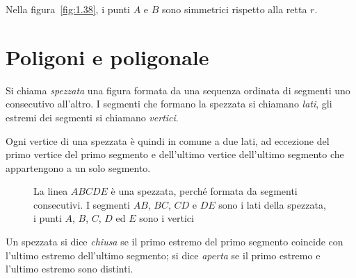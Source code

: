 Nella figura~\ref{fig:1.38}, i punti $A$ e $B$ sono simmetrici 
rispetto alla retta $r$.

\vspazio\ovalbox{\risolvii \ref{ese:1.66}, \ref{ese:1.67}, 
\ref{ese:1.68}, \ref{ese:1.69}, \ref{ese:1.70}, \ref{ese:1.71}, 
\ref{ese:1.72}, \ref{ese:1.73}, \ref{ese:1.74}, \ref{ese:1.75}, 
\ref{ese:1.76}, \ref{ese:1.77}, \ref{ese:1.78},}

\ovalbox{\ref{ese:1.79}, \ref{ese:1.80}, \ref{ese:1.81}, 
\ref{ese:1.82}, \ref{ese:1.83}, \ref{ese:1.84}, \ref{ese:1.85}, 
\ref{ese:1.86}, \ref{ese:1.87}, \ref{ese:1.88}, \ref{ese:1.89}, 
\ref{ese:1.90}, \ref{ese:1.91}, \ref{ese:1.92},\ref{ese:1.93}, 
\ref{ese:1.94}, \ref{ese:1.95},}

\ovalbox{\ref{ese:1.96}, \ref{ese:1.97}, \ref{ese:1.98}, 
\ref{ese:1.99}, \ref{ese:1.100}, \ref{ese:1.101}, \ref{ese:1.102}, 
\ref{ese:1.103}}




\section{Poligoni e poligonale}\label{sect:poligoni}

\begin{definizione}
Si chiama \emph{spezzata} una figura formata da una sequenza ordinata 
di segmenti uno consecutivo all'altro. I segmenti che formano la 
spezzata si chiamano \emph{lati}, gli estremi dei segmenti si 
chiamano \emph{vertici}.
\end{definizione}

Ogni vertice di una spezzata è quindi in comune a due lati, ad 
eccezione del primo vertice del primo segmento e dell'ultimo vertice 
dell'ultimo segmento che appartengono a un solo segmento.


\begin{inaccessibleblock}
 \begin{figure}[htb]
\centering
\caption{La linea $ABCDE$ è una spezzata, perché formata da segmenti 
consecutivi. I segmenti $AB$, $BC$, $CD$ e $DE$ sono i lati della 
spezzata, i punti $A$, $B$, $C$, $D$ ed $E$ sono i vertici}
\end{figure}
\end{inaccessibleblock}

\begin{definizione}
Un spezzata si dice \emph{chiusa} se il primo estremo del primo 
segmento coincide con l'ultimo estremo dell'ultimo segmento; si dice 
\emph{aperta} se il primo estremo e l'ultimo estremo sono distinti.
\end{definizione}

